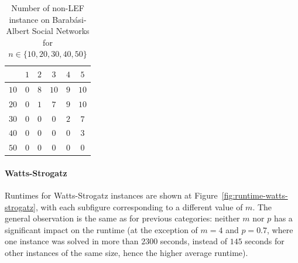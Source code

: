 \documentclass{article}
\begin{document}
\begin{table}[htb]
\centering
\begin{tabular}{|c|c|c|c|c|c|}
	\hline
	\backslashbox{$n$}{$m$} & $1$ & $2$ & $3$ & $4$ & $5$ \\ \hline
	$10$ & $0$ & $8$ & $10$ & $9$ & $10$ \\
	$20$ & $0$ & $1$ & $7$ & $9$ & $10$ \\
	$30$ & $0$ & $0$ & $0$ & $2$ & $7$ \\
	$40$ & $0$ & $0$ & $0$ & $0$ & $3$ \\
	$50$ & $0$ & $0$ & $0$ & $0$ & $0$ \\
	\hline
\end{tabular}
\caption{Number of non-LEF instance on Barab\'asi-Albert Social Networks for $n \in \{10,20,30,40,50\}$\label{tab:non-lef-barabasi-albert}}
\end{table}

\paragraph{Watts-Strogatz} Runtimes for Watts-Strogatz instances are shown at Figure~\ref{fig:runtime-watts-strogatz}, with each subfigure corresponding to a different value of  $m $. The general observation is the same as for previous categories: neither $m$ nor $p$ has a significant impact on the runtime (at the exception of $m=4$ and $p=0.7$, where one instance was solved in more than $2300$ seconds, instead of $145$ seconds for other instances of the same size, hence the higher average runtime).
\end{document}
